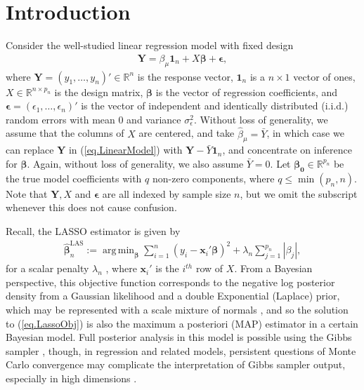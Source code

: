 \documentclass[ejs,authoryear,linksfromyear]{imsart}
\DeclareMathOperator*{\argmin}{arg\,min} %
\newcommand{\sumin}{\sum_{i=1}^n} %
\newcommand{\bLAS}{\widehat{\bm{\beta}}_n^{\text{LAS}}} %
\numberwithin{equation}{section}
\theoremstyle{plain}
\begin{document}
\section{Introduction}

Consider the well-studied linear regression model with fixed design 
\begin{align} 
\label{eq.LinearModel}
\bm{Y} = \beta_{\mu} \bm{1}_n + X \bm{\beta} + \bm{\epsilon},
\end{align}
where $\bm{Y} = (y_1, \ldots, y_n)' \in \mathbb{R}^n$ is the response vector, $\bm{1}_n$ is a $n \times 1$ vector of ones, $X \in \mathbb{R}^{n \times p_n}$ is the design matrix, $\bm{\beta}$ is the vector of regression coefficients, and $\bm{\epsilon} = (\epsilon_1, \ldots, \epsilon_n)'$ is the vector of independent and identically distributed (i.i.d.) random errors with mean 0 and variance $\sigma^2_{\epsilon}$. Without loss of generality, we assume that the columns of $X$ are centered, and take $\widehat{\beta}_{\mu} = \bar{Y}$, in which case we can replace $\bm{Y}$ in (\ref{eq.LinearModel}) with $\bm{Y} - \bar{Y} \bm{1}_n$, and concentrate on inference for $\bm{\beta}$. Again, without loss of generality, we also assume $\bar{Y} =0$. Let $\bm{\beta_0} \in \mathbb{R}^{p_n}$ be the true model coefficients with $q$ non-zero components, where $q \leq \min(p_n, n)$. Note that $\bm{Y}, X$ and $\bm{\epsilon}$ are all indexed by sample size $n$, but we omit the subscript whenever this does not cause confusion. 

Recall, the LASSO estimator is given by 
\begin{align} \label{eq.LassoObj}
\bLAS
:= \argmin_{\bm{\beta}} 
\sumin ( y_i - \bm{x}_i' \bm{\beta} )^2 
+ \lambda_n \sum_{j=1}^{p_n} |\beta_j|,
\end{align}   
for a scalar penalty $\lambda_n$ \citep{Lasso}, where $\bm{x}_i'$ is the $i^{th}$ row of $X$. From a Bayesian perspective, this objective function corresponds to the negative log posterior density from a Gaussian likelihood and a double Exponential (Laplace) prior, which may be represented with a scale mixture of normals \citep{ScaleMixtureNormal}, and so the solution to (\ref{eq.LassoObj}) is also 
the maximum a posteriori (MAP) estimator  in a certain Bayesian model. Full
posterior analysis in this model is possible using the Gibbs sampler \citep{BayesianLasso}, though, in regression and related models, persistent questions
of Monte Carlo convergence may complicate the interpretation of Gibbs sampler output, especially in high dimensions \citep[e.g.,][]{WellingTeh,rajaratnam2015mcmc,robert2018accelerating,qin2019convergence}.
\end{document}
